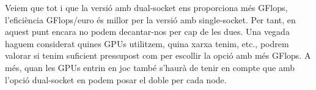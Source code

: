 \begin{table}[H]
\begin{adjustwidth}{-.5in}{-.5in}  
    \begin{center}
    \centering
    \caption{Comparació entre les diferents configuracions dels nodes.}
    \label{tab:cpu_cmp}
    \end{center}
    \end{adjustwidth}
\end{table}

Veiem que tot i que la versió amb dual-socket ens proporciona més GFlops, l'eficiència GFlops/euro és millor per la versió amb single-socket. Per tant, en aquest punt encara no podem decantar-nos per cap de les dues. Una vegada haguem considerat quines GPUs utilitzem, quina xarxa tenim, etc., podrem valorar si tenim suficient pressupost com per escollir la opció amb més GFlops. A més, quan les GPUs entrin en joc també s'haurà de tenir en compte que amb l'opció dual-socket en podem posar el doble per cada node.

